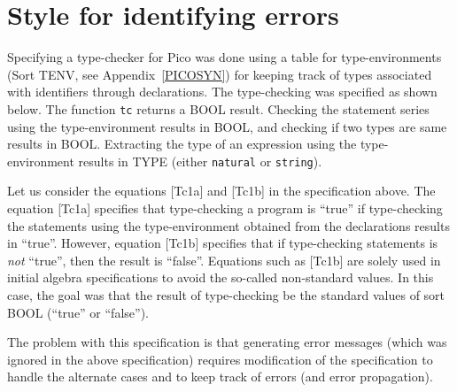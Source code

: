 


\section{\label{PicoTcOld}Style for identifying errors}

Specifying a type-checker for Pico was done using a table
for type-environments (Sort TENV, see Appendix~\ref{PICOSYN}) 
for keeping track of types associated with
identifiers through declarations. The type-checking was
specified as shown below. The function {\tt tc} returns
a BOOL result. Checking the statement series using the
type-environment results in BOOL, and checking if two types
are same results in BOOL. Extracting the type of an expression
using the type-environment results in TYPE (either {\tt natural}
or {\tt string}).



Let us consider the equations [Tc1a] and [Tc1b] in the specification
above. The equation [Tc1a] specifies that type-checking
a program is ``true'' if type-checking the statements using
the type-environment obtained from the declarations results in ``true''.
However, equation [Tc1b] specifies that if type-checking statements 
is {\em not} ``true'', then the result is ``false''.
Equations such as [Tc1b] are solely used in initial algebra
specifications to avoid the so-called non-standard values.
In this case, the goal was that the result of type-checking
be the standard values of sort BOOL (``true'' or ``false'').

The problem with this specification is that generating
error messages (which was ignored in the above specification)
requires modification of the specification to handle the
alternate cases and to keep track of errors (and error propagation).

